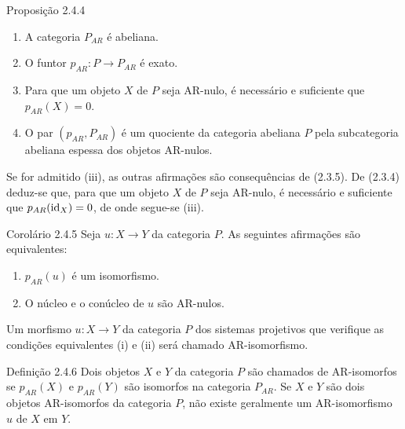 \begin{statement}{Proposição 2.4.4}
\begin{enumerate}[label=(\roman*)]
\item A categoria $P_{AR}$ é abeliana.
\item O funtor $p_{AR}:P\to P_{AR}$ é exato.
\item Para que um objeto $X$ de $P$ seja AR-nulo, é necessário e suficiente que $p_{AR}(X)=0$.
\item O par $(p_{AR},P_{AR})$ é um quociente da categoria abeliana $P$ pela subcategoria abeliana espessa dos objetos AR-nulos.
\end{enumerate}
\end{statement}

\begin{prooftext}[Demonstração]
Se for admitido (iii), as outras afirmações são consequências de (2.3.5). De (2.3.4) deduz-se que, para que um objeto $X$ de $P$ seja AR-nulo, é necessário e suficiente que $p_{AR}(\operatorname{id}_X)=0$, de onde segue-se (iii).
\end{prooftext}

\begin{statement}{Corolário 2.4.5}
Seja $u:X\to Y$ da categoria $P$. As seguintes afirmações são equivalentes:
\begin{enumerate}[label=(\roman*)]
\item $p_{AR}(u)$ é um isomorfismo.
\item O núcleo e o conúcleo de $u$ são AR-nulos.
\end{enumerate}
Um morfismo $u:X\to Y$ da categoria $P$ dos sistemas projetivos que verifique as condições equivalentes (i) e (ii) será chamado AR-isomorfismo.
\end{statement}

\begin{statement}{Definição 2.4.6}
Dois objetos $X$ e $Y$ da categoria $P$ são chamados de AR-isomorfos se $p_{AR}(X)$ e $p_{AR}(Y)$ são isomorfos na categoria $P_{AR}$. Se $X$ e $Y$ são dois objetos AR-isomorfos da categoria $P$, não existe geralmente um AR-isomorfismo $u$ de $X$ em $Y$.
\end{statement}
